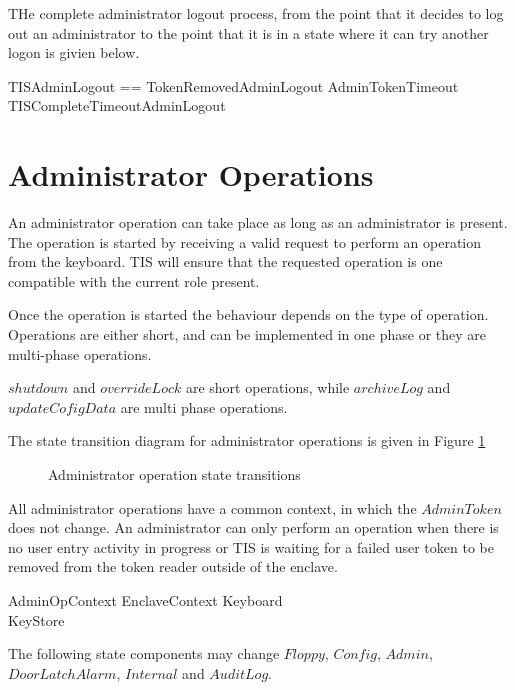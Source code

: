 THe complete administrator logout process, from the point that it
decides to log out an administrator to the point that it is in a state
where it can try another logon is givien below.

\begin{zed}
TISAdminLogout ==  TokenRemovedAdminLogout \lor AdminTokenTimeout \lor TISCompleteTimeoutAdminLogout 
\end{zed}

\section{Administrator Operations}
An administrator operation can take place as long as an administrator
is present. The operation is started by receiving a valid request to
perform an operation from the keyboard. TIS will ensure that the
requested operation is one compatible with the current role present.

Once the operation is started the behaviour depends on the type of
operation. Operations are either short, and can be implemented in one
phase or they are multi-phase operations. 

$shutdown$ and $overrideLock$ are short operations, while $archiveLog$
and $updateCofigData$ are multi phase operations.

The state transition diagram for administrator operations is given in
Figure \ref{fig:adminOp}

\begin{figure}[htbp]
  \begin{center}
    \leavevmode
    \caption{Administrator operation state transitions}
    \label{fig:adminOp}
  \end{center}
\end{figure}

All administrator operations have a common context, in which the
$AdminToken$ does not change.
An administrator can only perform an operation when there is no user 
entry activity
in progress or TIS is waiting for a failed user token to be removed
from the token reader outside of the enclave.


\begin{schema}{AdminOpContext}
        EnclaveContext
\also
        \Xi Keyboard
\\      \Xi KeyStore
\end{schema}
\begin{Zcomment}
\item
The following state components may change   
$Floppy$, $Config$, $Admin$, $DoorLatchAlarm$, $Internal$ and $AuditLog$. 
\end{Zcomment}

